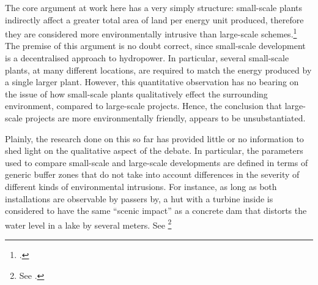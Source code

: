 The core argument at work here has a very simply structure: small-scale plants indirectly affect a greater total area of land per energy unit produced, therefore they are considered more environmentally intrusive than large-scale schemes.\footcite[96-99]{bakken14} The premise of this argument is no doubt correct, since small-scale development is a decentralised approach to hydropower. In particular, several small-scale plants, at many different locations, are required to match the energy produced by a single larger plant. However, this quantitative observation has no bearing on the issue of how small-scale plants qualitatively effect the surrounding environment, compared to large-scale projects. Hence, the conclusion that large-scale projects are more environmentally friendly, appears to be  unsubstantiated.

Plainly, the research done on this so far has provided little or no information to shed light on the qualitative aspect of the debate. In particular, the parameters used to compare small-scale and large-scale developments are defined in terms of generic buffer zones that do not take into account differences in the severity of different kinds of environmental intrusions. For instance, as long as both installations are observable by passers by, a hut with a turbine inside is considered to have the same ``scenic impact'' as a concrete dam that distorts the water level in a lake by several meters. See \footnote{See \cite[95]{bakken14}.}


